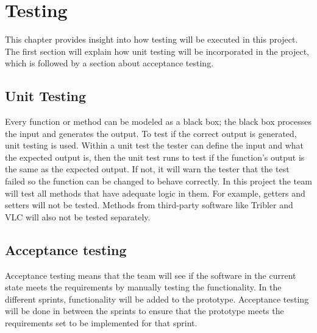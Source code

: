 \chapter{Testing}
\label{sec:test}
This chapter provides insight into how testing will be executed in this project. The first section will explain how unit testing will be incorporated  in the project, which is followed by a section about acceptance testing.

\section{Unit Testing}
Every function or method can be modeled as a black box; the black box processes the input and generates the output. To test if the correct output is generated, unit testing is used. Within a unit test the tester can define the input and what the expected output is, then the unit test runs to test if the function's output is the same as the expected output. If not, it will warn the tester that the test failed so the function can be changed to behave correctly. 
In this project the team will test all methods that have adequate logic in them. For example, getters and setters will not be tested. Methods from third-party software like Tribler and VLC will also not be tested separately. 

\section{Acceptance testing}
Acceptance testing means that the team will see if the software in the current state meets the requirements by manually testing the functionality. In the different sprints, functionality will be added to the prototype. Acceptance testing will be done in between the sprints to ensure that the prototype meets the requirements set to be implemented for that sprint.